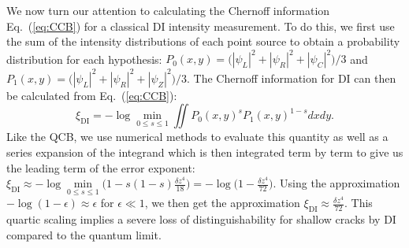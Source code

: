 \documentclass[reprint,amsmath,amssymb,aps,prl,floatfix,groupedaddress,superscriptaddress]{revtex4-2}
\begin{document}
We now %
turn our attention to calculating the Chernoff information Eq.~(\ref{eq:CCB}) for a classical DI intensity measurement. To do this, we first use the sum of the intensity distributions of each point source to obtain a probability distribution for each hypothesis: $P_0(x,y) = \big({|\psi_L|^2 + |\psi_R|^2 + |\psi_C|^2}\big)/{3}$ and $P_1(x,y) = \big({|\psi_L|^2 + |\psi_R|^2 + |\psi_Z|^2}\big)/{3}$. The Chernoff information for DI can then be calculated from Eq.~(\ref{eq:CCB}):
\begin{equation}\label{eq:CI_DI}
\xi_{\textrm{DI}} = - \log \min_{0 \leq s \leq 1} \mbox{$\iint P_0(x,y)^s P_1(x,y)^{1-s} dx dy$}.
\end{equation}
Like the QCB, we use numerical methods to evaluate this quantity as well as a series expansion of the integrand which is then integrated term by term to give us the leading term of the error exponent: $\xi_{\textrm{DI}} \approx - \log \min\limits_{0 \leq s \leq 1} \big( 1 - s(1-s) \frac{\delta z^4}{18}\big) = -\log \big(1 - \frac{\delta z^4}{72} \big)$.
Using the approximation $-\log(1-\epsilon) \approx \epsilon$ for $\epsilon \ll 1$, we then get the approximation $\xi_{\textrm{DI}} \approx \frac{\delta z^4}{72}$. This quartic scaling implies a severe loss of distinguishability for shallow cracks by DI compared to the quantum limit.
\end{document}
